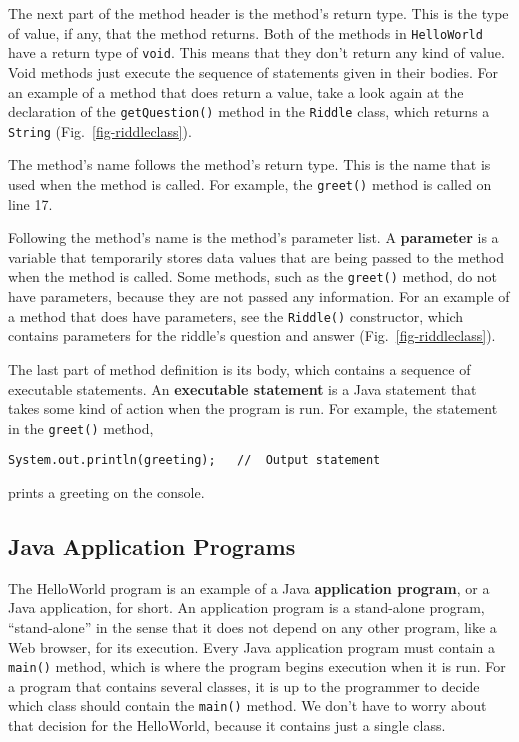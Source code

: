 The next part of the method header is the method's return type. This
is the type of value, if any, that the method returns.  Both of the
methods in {\tt HelloWorld} have a return type of {\tt void}. This
means that they don't return any kind of value. Void methods just
execute the sequence of statements given in their bodies.  For an
example of a method that does return a value, take a look again at the
declaration of the {\tt getQuestion()} method in the {\tt Riddle}
class, which returns a {\tt String} (Fig.~\ref{fig-riddleclass}).

The method's name follows the method's return type. This is the name
that is used when the method is called. For example, the {\tt greet()}
method is called on line 17.

Following the method's name is the method's parameter list. A {\bf
parameter} is a variable that temporarily stores data values that are
being passed to the method when the method is called. Some methods,
such as the {\tt greet()} method, do not have parameters, because they
are not passed any information. For an example of a method that does
have parameters, see the {\tt Riddle()} constructor, which contains
parameters for the riddle's question and answer
(Fig.~\ref{fig-riddleclass}).  

The last part of method definition is its body, which contains a
sequence of executable statements. An {\bf executable statement} is a
Java statement that takes some kind of action when the program is run.
For example, the statement in the {\tt greet()} method,

\begin{jjjlisting}
\begin{lstlisting}
System.out.println(greeting);   //  Output statement
\end{lstlisting}
\end{jjjlisting}

\noindent prints a greeting on the console. 

\subsection{Java Application Programs}

The HelloWorld program is an example of a Java {\bf application
program}, or a Java application, for short.  An application program is
a stand-alone program, ``stand-alone'' in the sense that it does not
depend on any other program, like a Web browser, for its execution.
Every Java application program must contain a {\tt main()} method,
which is where the program begins execution when it is run. For a
program that contains several classes, it is up to the programmer to
decide which class should contain the {\tt main()} method. We don't
have to worry about that decision for the HelloWorld, because it
contains just a single class.

